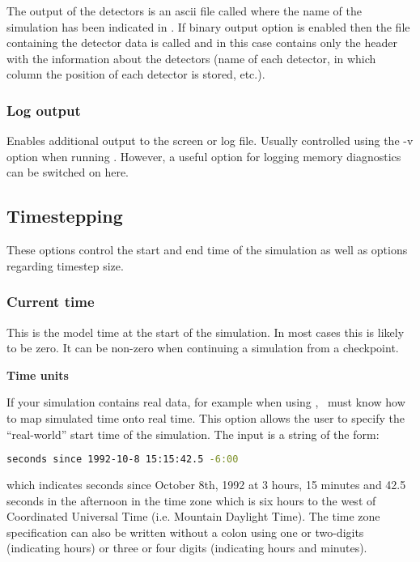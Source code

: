 The output of the detectors is an ascii file called
 where the name of the simulation has
been indicated in . If binary output
  option is enabled then the file containing the detector data is called
 and in this case  contains only the header with the
information about the detectors (name of each detector, in which column the
position of each detector is stored, etc.).

\subsubsection{Log output}

Enables additional output to the screen or log file. Usually controlled
using the -v option when running \fluidity. However, a useful option for
logging memory diagnostics can be switched on here.

\subsection{Timestepping}
These options control the start and end time of the simulation as well as options regarding timestep size.

\subsubsection{Current time}
This is the model time at the start of the simulation. In most cases this is likely to be zero. It can be non-zero when continuing a simulation from a checkpoint.

\textbf{Time units}

If your simulation contains real data, for example when using
, \fluidity\ must know how to map simulated time onto
real time. This option allows the user to specify the ``real-world'' start
time of the simulation.  The input is a string of the form:
\begin{lstlisting}[language=bash]
seconds since 1992-10-8 15:15:42.5 -6:00 
\end{lstlisting} 

which indicates seconds since October 8th, 1992 at 3 hours, 15 minutes and
42.5 seconds in the afternoon in the time zone which is six hours to the
west of Coordinated Universal Time (i.e. Mountain Daylight Time). The time
zone specification can also be written without a colon using one or
two-digits (indicating hours) or three or four digits (indicating hours and
minutes).


